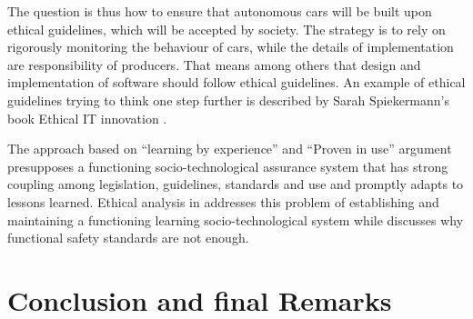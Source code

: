 The question is thus how to ensure that autonomous cars will be built upon ethical guidelines, which will be accepted by society. The strategy is to rely on rigorously monitoring the behaviour of cars, while the details of implementation are responsibility of producers. That means among others that design and implementation of software should follow ethical guidelines. An example of ethical guidelines trying to think one step further is described by Sarah Spiekermann's book Ethical IT innovation \cite{spiekermann2015ethical}. 

The approach based on \enquote{learning by experience} and \enquote{Proven in use} argument \cite{GovernmentNL2017,NationalInstruments2014a,DBLP:journals/corr/SchabeB15} presupposes a functioning socio-technological assurance system that has strong coupling among legislation, guidelines, standards and use and promptly adapts to lessons learned. Ethical analysis in \cite{DodigCrnkovic2012, Thekkilakattil_7273594,Johnsen2017_7958474} addresses this problem of establishing and maintaining a functioning learning socio-technological system while \cite{Johnsen2017_7958474} discusses why functional safety standards are not enough.


\section{Conclusion and final Remarks}
\label{sec:Conclusion}


